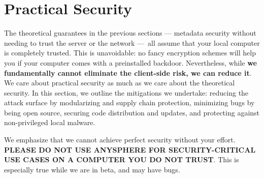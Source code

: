 \section{Practical Security}

The theoretical guarantees in the previous sections — metadata security without needing to trust
the server or the network — all assume that your local computer is completely trusted. This is unavoidable: no fancy encryption schemes will help you if your computer comes with a preinstalled backdoor. Nevertheless, while \textbf{we fundamentally cannot eliminate the client-side risk, we can reduce it}. We care about practical security as much as we care about the theoretical security. In this section, we outline the mitigations we undertake: reducing the attack surface by modularizing and supply chain protection, minimizing bugs by being open source, securing code distribution and updates, and protecting against non-privileged local malware.

We emphasize that we cannot achieve perfect security without your effort. \textbf{PLEASE DO NOT USE ANYSPHERE FOR SECURITY-CRITICAL USE CASES ON A COMPUTER YOU DO NOT TRUST}. This is especially true while we are in beta, and may have bugs.




